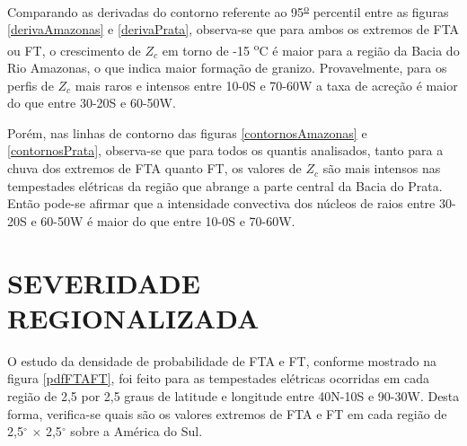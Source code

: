 Comparando as derivadas do contorno referente ao 95\textsuperscript{\underline{o}} percentil entre as figuras \ref{derivaAmazonas} e \ref{derivaPrata}, observa-se que para ambos os extremos de FTA ou FT, o crescimento de $Z_c$ em torno de -15 \textsuperscript{o}C é maior para a região da Bacia do Rio Amazonas, o que indica maior formação de granizo. Provavelmente, para os perfis de $Z_c$ mais raros e intensos entre 10-0S e 70-60W a taxa de acreção é maior do que entre 30-20S e 60-50W. 

Porém, nas linhas de contorno das figuras \ref{contornosAmazonas} e \ref{contornosPrata}, observa-se que para todos os quantis analisados, tanto para a chuva dos extremos de FTA quanto FT, os valores de $Z_c$ são mais intensos nas tempestades elétricas da região que abrange a parte central da Bacia do Prata. Então pode-se afirmar que a intensidade convectiva dos núcleos de raios entre 30-20S e 60-50W é maior do que entre 10-0S e 70-60W. 


\section{SEVERIDADE REGIONALIZADA}


O estudo da densidade de probabilidade de FTA e FT, conforme mostrado na figura \ref{pdfFTAFT}, foi feito para as tempestades elétricas ocorridas em cada região de 2,5 por 2,5 graus de latitude e longitude entre 40N-10S e 90-30W. Desta forma, verifica-se quais são os valores extremos de FTA e FT em cada região de 2,5$^{\circ}$ $\times$ 2,5$^{\circ}$ sobre a América do Sul. 


